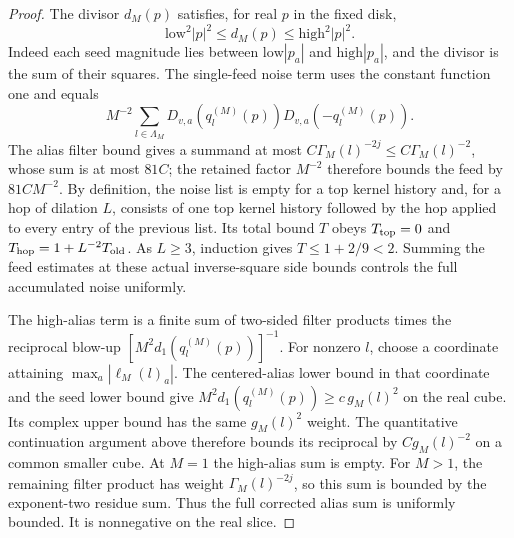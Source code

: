 \begin{proof}
The divisor $d_M(p)$ satisfies, for real $p$ in the fixed disk,
\[
 \mathrm{low}^2|p|^2\leq d_M(p)\leq\mathrm{high}^2|p|^2.
\]
Indeed each seed magnitude lies between $\mathrm{low}|p_a|$ and
$\mathrm{high}|p_a|$, and the divisor is the sum of their squares. The
single-feed noise term uses the constant function one and equals
\[
 M^{-2}\sum_{l\in\Lambda_M}
  D_{v,a}(q_l^{(M)}(p))D_{v,a}(-q_l^{(M)}(p)).
\]
The alias filter bound gives a summand at most
$C\Gamma_M(l)^{-2j}\leq C\Gamma_M(l)^{-2}$, whose sum is at most $81C$;
the retained factor $M^{-2}$ therefore bounds the feed by $81C M^{-2}$.
By definition, the noise list is empty for a top kernel history and, for a hop of dilation
$L$, consists of one top kernel history followed by the hop applied to every entry
of the previous list. Its total bound $T$ obeys
$T_{\rm top}=0$ and $T_{\rm hop}=1+L^{-2}T_{\rm old}$. As $L\geq3$,
induction gives $T\leq 1+2/9<2$. Summing the feed estimates at these actual
inverse-square side bounds controls the full accumulated noise uniformly.

The high-alias term is a finite sum of two-sided filter products times
the reciprocal blow-up $[M^2d_1(q_l^{(M)}(p))]^{-1}$. For nonzero $l$, choose a
coordinate attaining $\max_a|\ell_M(l)_a|$. The centered-alias lower bound
in that coordinate and the seed lower bound give
$M^2d_1(q_l^{(M)}(p))\geq c\,g_M(l)^2$ on the real cube. Its complex upper bound
has the same $g_M(l)^2$ weight. The quantitative continuation argument
above therefore bounds its reciprocal by $C g_M(l)^{-2}$ on a common
smaller cube. At $M=1$ the high-alias sum is empty. For $M>1$, the remaining filter product has weight
$\Gamma_M(l)^{-2j}$, so this sum is bounded by the exponent-two residue
sum. Thus the full corrected alias sum is uniformly bounded. It is nonnegative on the
real slice.


\end{proof}
